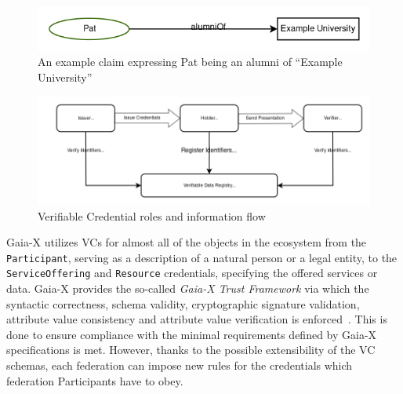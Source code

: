 \begin{figure}
    \centering
    \includegraphics[width=\textwidth]{figures/verifiable-credential-claim-example.png}
    \caption{An example claim expressing Pat being an alumni of ``Example University''~\cite{verifiable_credentials}}\label{fig:verifiable-credential-claim}
\end{figure}
\begin{figure}
    \centering
    \includegraphics[width=\textwidth]{figures/verifiable-credentials.png}
    \caption{Verifiable Credential roles and information flow~\cite{verifiable_credentials}}\label{fig:verifiable-credentials}
\end{figure}

Gaia-X utilizes VCs for almost all of the objects in the ecosystem from the \texttt{Participant}, serving as a description of a natural person or a legal entity, to the \texttt{ServiceOffering} and \texttt{Resource} credentials, specifying the offered services or data.
Gaia-X provides the so-called \textit{Gaia-X Trust Framework} via which the syntactic correctness, schema validity, cryptographic signature validation, attribute value consistency and attribute value verification is enforced~\cite{gaiax_architecture_document}.
This is done to ensure compliance with the minimal requirements defined by Gaia-X specifications is met.
However, thanks to the possible extensibility of the VC schemas, each federation can impose new rules for the credentials which federation Participants have to obey.

